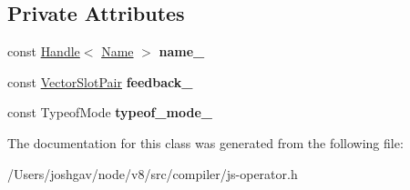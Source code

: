\subsection*{Private Attributes}
\begin{DoxyCompactItemize}
\item 
const \hyperlink{classv8_1_1internal_1_1_handle}{Handle}$<$ \hyperlink{classv8_1_1internal_1_1_name}{Name} $>$ {\bfseries name\+\_\+}\hypertarget{classv8_1_1internal_1_1compiler_1_1_load_global_parameters_a0f0cdcbec94a0d788421dd026e3e4cdb}{}\label{classv8_1_1internal_1_1compiler_1_1_load_global_parameters_a0f0cdcbec94a0d788421dd026e3e4cdb}

\item 
const \hyperlink{classv8_1_1internal_1_1compiler_1_1_vector_slot_pair}{Vector\+Slot\+Pair} {\bfseries feedback\+\_\+}\hypertarget{classv8_1_1internal_1_1compiler_1_1_load_global_parameters_adf1627d80568ee7b418c907c24c62876}{}\label{classv8_1_1internal_1_1compiler_1_1_load_global_parameters_adf1627d80568ee7b418c907c24c62876}

\item 
const Typeof\+Mode {\bfseries typeof\+\_\+mode\+\_\+}\hypertarget{classv8_1_1internal_1_1compiler_1_1_load_global_parameters_a094d325126972ad60bc3db9bba9d6174}{}\label{classv8_1_1internal_1_1compiler_1_1_load_global_parameters_a094d325126972ad60bc3db9bba9d6174}

\end{DoxyCompactItemize}


The documentation for this class was generated from the following file\+:\begin{DoxyCompactItemize}
\item 
/\+Users/joshgav/node/v8/src/compiler/js-\/operator.\+h\end{DoxyCompactItemize}
